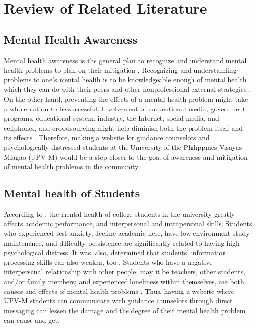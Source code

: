 \chapter{Review of Related Literature}
\label{sec:relatedlit}



\section{Mental Health Awareness}
Mental health awareness is the general plan to recognize and understand mental health problems to plan on their mitigation . Recognizing and understanding problems to one’s mental health is to be knowledgeable enough of mental health \cite{jorm2000mental} which they can do with their peers and other nonprofessional external strategies . On the other hand, preventing the effects of a mental health problem might take a whole nation to be successful. Involvement of conventional media, government programs, educational system, industry, the Internet, social media, and cellphones, and crowdsourcing might help diminish both the problem itself and its effects . Therefore, making a website for guidance counselors and psychologically distressed students at the University of the Philippines Visayas-Miagao (UPV-M) would be a step closer to the goal of awareness and mitigation of mental health problems in the community. 

\section{Mental health of Students}



According to , the mental health of college students in the university greatly affects academic performance, and interpersonal and intrapersonal skills. Students who experienced test anxiety, decline academic help, have low environment study maintenance, and difficulty persistence are significantly related to having high psychological distress. It was, also, determined that students’ information processing skills can also weaken, too \cite{kitzrow2003mental}. Students who have a negative interpersonal relationship with other people, may it be teachers, other students, and/or family members; and experienced loneliness within themselves, are both causes and effects of mental health problems \cite{american1980diagnostic}. Thus, having a website where UPV-M students can communicate with guidance counselors through direct messaging can lessen the damage and the degree of their mental health problem can cause and get. 

